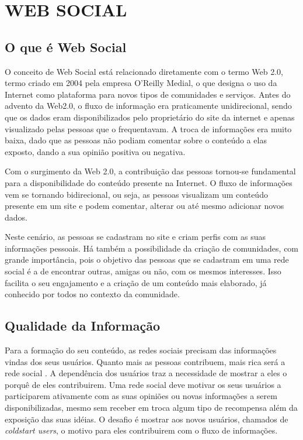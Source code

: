 \chapter{WEB SOCIAL} %
\label{cha:web_social}

\section{O que é Web Social}

O conceito de Web Social está relacionado diretamente com o termo Web 2.0, termo criado em 2004 pela empresa O'Reilly Medial, o que designa o uso da Internet como plataforma para novos tipos de comunidades e serviços. Antes do advento da Web2.0, o fluxo de informação era praticamente unidirecional, sendo que os dados eram disponibilizados pelo proprietário do site da internet e apenas visualizado pelas pessoas que o frequentavam. A troca de informações era muito baixa, dado que as pessoas não podiam comentar sobre o conteúdo a elas exposto, dando a sua opinião positiva ou negativa.

Com o surgimento da Web 2.0, a contribuição das pessoas tornou-se fundamental para a disponibilidade do conteúdo presente na Internet. O fluxo de informações vem se tornando bidirecional, ou seja, as pessoas visualizam um conteúdo presente em um site e podem comentar, alterar ou até mesmo adicionar novos dados.

Neste cenário, as pessoas se cadastram no site e criam perfis com as suas informações pessoais. Há também a possibilidade da criação de comunidades, com grande importância, pois o objetivo das pessoas que se cadastram em uma rede social é a de encontrar outras, amigas ou não, com os mesmos interesses. Isso facilita o seu engajamento e a criação de um conteúdo mais elaborado, já conhecido por todos no contexto da comunidade.

\section{Qualidade da Informação}

Para a formação do seu conteúdo, as redes sociais precisam das informações vindas dos seus usuários. Quanto mais as pessoas contribuem, mais rica será a rede social \cite{burke2009fmm}. A dependência dos usuários traz a necessidade de mostrar a eles o porquê de eles contribuirem. Uma rede social deve motivar os seus usuários a participarem ativamente com as suas opiniões ou novas informações a serem disponibilizadas, mesmo sem receber em troca algum tipo de recompensa além da exposição das suas idéias. O desafio é mostrar aos novos usuários, chamados de \textit{coldstart users}, o motivo para eles contribuirem com o fluxo de informações.

